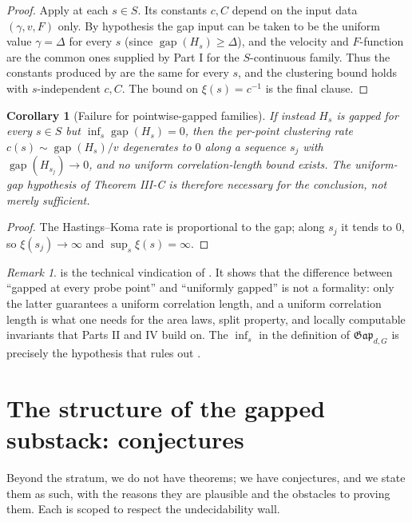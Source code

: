 \documentclass[12pt]{article}
\newcommand{\Ffun}{F}                          %
\newcommand{\Gap}{\mathfrak{Gap}}              %
\newcommand{\gapof}[1]{\operatorname{gap}(#1)} %
\newcommand{\gapbound}{\Delta}                  %
\DeclareMathOperator*{\einf}{inf}
\theoremstyle{plain}
\newtheorem{corollary}[corollary]{Corollary}
\theoremstyle{definition}
\theoremstyle{remark}
\newtheorem{remark}[remark]{Remark}
\begin{document}
\begin{proof}
Apply  at each $s\in S$. Its constants $c,C$ depend on the input data
$(\gamma,v,\Ffun)$ only. By hypothesis the gap input can be taken to be the uniform
value $\gamma=\gapbound$ for every $s$ (since $\gapof{H_s}\ge\gapbound$), and the
velocity and $\Ffun$-function are the common ones supplied by Part I for the
$S$-continuous family. Thus the constants produced by  are the same for
every $s$, and the clustering bound holds with $s$-independent $c,C$. The bound on
$\xi(s)=c^{-1}$ is the final clause.
\end{proof}

\begin{corollary}[Failure for pointwise-gapped families]
\label{cor:pointwise-fail}
If instead $H_s$ is gapped for every $s\in S$ but $\einf_s\gapof{H_s}=0$, then the
per-point clustering rate $c(s)\sim\gapof{H_s}/v$ degenerates to $0$ along a sequence
$s_j$ with $\gapof{H_{s_j}}\to 0$, and no uniform correlation-length bound exists. The
uniform-gap hypothesis of Theorem III-C is therefore necessary for the conclusion, not
merely sufficient.
\end{corollary}

\begin{proof}
The Hastings--Koma rate is proportional to the gap; along $s_j$ it tends to $0$, so
$\xi(s_j)\to\infty$ and $\sup_s\xi(s)=\infty$.
\end{proof}

\begin{remark}
\label{rem:clustering-meaning}
 is the technical vindication of . It shows
that the difference between ``gapped at every probe point'' and ``uniformly gapped''
is not a formality: only the latter guarantees a uniform correlation length, and a
uniform correlation length is what one needs for the area laws, split property, and
locally computable invariants that Parts II and IV build on. The $\einf_s$ in the
definition of $\Gap_{d,G}$ is precisely the hypothesis that rules out
.
\end{remark}

\section{The structure of the gapped substack: conjectures}
\label{sec:conjectures}

Beyond the stratum, we do not have theorems; we have conjectures, and we state them
as such, with the reasons they are plausible and the obstacles to proving them. Each
is scoped to respect the undecidability wall.
\end{document}
